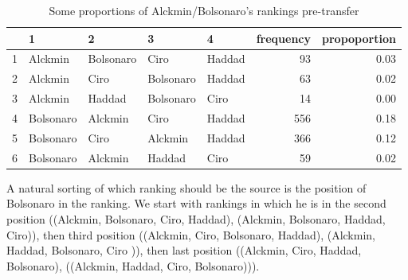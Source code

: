 \documentclass[hidelinks,11pt]{article}
\begin{document}
\begin{table}[!h]
  \centering
\begin{tabular}{rllllrr}
  \hline
 & 1 & 2 & 3 & 4 & frequency & propoportion \\
  \hline
  1 & Alckmin & Bolsonaro & Ciro & Haddad & 93 & 0.03 \\
  2 & Alckmin & Ciro & Bolsonaro & Haddad & 63 & 0.02 \\
  3 & Alckmin & Haddad & Bolsonaro & Ciro & 14 & 0.00 \\
  4 & Bolsonaro & Alckmin & Ciro & Haddad & 556 & 0.18 \\
  5 & Bolsonaro & Ciro & Alckmin & Haddad & 366 & 0.12 \\
  6 & Bolsonaro & Alckmin & Haddad & Ciro & 59 & 0.02 \\
   \hline
\end{tabular}
\caption{Some proportions of Alckmin/Bolsonaro's rankings  pre-transfer}
\label{tbl:overunderex}
\end{table}

A natural sorting of which ranking should be the source is the position of
Bolsonaro in the ranking. We start with rankings in which he is in the second
position ((Alckmin, Bolsonaro, Ciro, Haddad), (Alckmin, Bolsonaro, Haddad,
Ciro)), then third position ((Alckmin, Ciro, Bolsonaro, Haddad), (Alckmin,
Haddad, Bolsonaro, Ciro )), then last position ((Alckmin, Ciro, Haddad,
Bolsonaro), ((Alckmin, Haddad, Ciro, Bolsonaro))).
\end{document}
